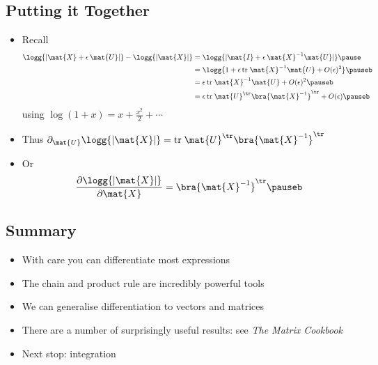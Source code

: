 
\begin{slide}
\section[-2]{Putting it Together}

\begin{PauseHighLight}
  \begin{itemize}
  \item Recall
    \begin{align*}
      \logg{|\mat{X}+\epsilon\,\mat{U}|} - \logg{|\mat{X}|}
      &= \logg{|\mat{I} + \epsilon\,\mat{X}^{-1}\mat{U}|}\pause \\
      &= \logg{1 + \epsilon \, \mathrm{tr}\; \mat{X}^{-1}\mat{U}+
        O(\epsilon)^2}\pauseb\\
        &=  \epsilon \, \mathrm{tr}\; \mat{X}^{-1}\mat{U}+
        O(\epsilon)^2\pauseb\\
        &= \epsilon \, \mathrm{tr}\; \mat{U}^\tr \bra{\mat{X}^{-1}}^\tr+ O(\epsilon)\pauseb
    \end{align*}
    using $\log(1+x) = x + \tfrac{x^2}{2} +
    \cdots$\pause {}
    \item Thus $\partial_{\mat{U}} \logg{|\mat{X}|} = \mathrm{tr}\;
      \mat{U}^\tr \bra{\mat{X}^{-1}}^\tr$\pauseb
    \item Or
      \begin{align*}
        \frac{\partial \logg{|\mat{X}|}}{\partial \mat{X}} =  \bra{\mat{X}^{-1}}^\tr\pauseb
      \end{align*}

  \end{itemize}
\end{PauseHighLight}

\end{slide}



\begin{slide}
\section{Summary}
  
\begin{PauseHighLight}
  \begin{itemize}
  \item With care you can differentiate most expressions\pause
  \item The chain and product rule are incredibly powerful tools\pause
  \item We can generalise differentiation to vectors and
    matrices\pause
  \item There are a number of surprisingly useful results\pause: see
    \emph{The Matrix Cookbook}\pauseb
  \item Next stop: integration\pauseb
  \end{itemize}
\end{PauseHighLight}

\end{slide}

